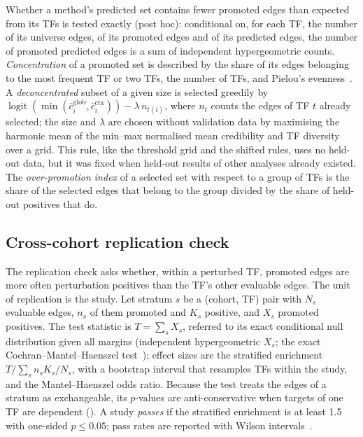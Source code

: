 \documentclass[11pt,a4paper]{article}
\begin{document}
Whether a method's predicted set contains fewer promoted edges than expected from its TFs is tested exactly (post hoc): conditional on, for each TF, the number of its universe edges, of its promoted edges and of its predicted edges, the number of promoted predicted edges is a sum of independent hypergeometric counts.
\emph{Concentration} of a promoted set is described by the share of its edges belonging to the most frequent TF or two TFs, the number of TFs, and Pielou's evenness~\citep{pielou1966measurement}. A \emph{deconcentrated} subset of a given size is selected greedily by $\operatorname{logit}(\min(\bar c_i^{\mathrm{glob}},\bar c_i^{\mathrm{ctx}}))-\lambda\, n_{t(i)}$, where $n_t$ counts the edges of TF $t$ already selected; the size and $\lambda$ are chosen without validation data by maximising the harmonic mean of the min--max normalised mean credibility and TF diversity over a grid. This rule, like the threshold grid and the shifted rules, uses no held-out data, but it was fixed when held-out results of other analyses already existed.
The \emph{over-promotion index} of a selected set with respect to a group of TFs is the share of the selected edges that belong to the group divided by the share of held-out positives that do.

\subsection{Cross-cohort replication check}\label{sec:replication}
The replication check asks whether, within a perturbed TF, promoted edges are more often perturbation positives than the TF's other evaluable edges.
The unit of replication is the study.
Let stratum $s$ be a (cohort, TF) pair with $N_s$ evaluable edges, $n_s$ of them promoted and $K_s$ positive, and $X_s$ promoted positives.
The test statistic is $T=\sum_s X_s$, referred to its exact conditional null distribution given all margins (independent hypergeometric $X_s$; the exact Cochran--Mantel--Haenszel test~\citep{mantel1959statistical}); effect sizes are the stratified enrichment $T/\sum_s n_sK_s/N_s$, with a bootstrap interval that resamples TFs within the study, and the Mantel--Haenszel odds ratio.
Because the test treats the edges of a stratum as exchangeable, its $p$-values are anti-conservative when targets of one TF are dependent ().
A study \emph{passes} if the stratified enrichment is at least 1.5 with one-sided $p\le0.05$; pass rates are reported with Wilson intervals~\citep{wilson1927probable}.
\end{document}
